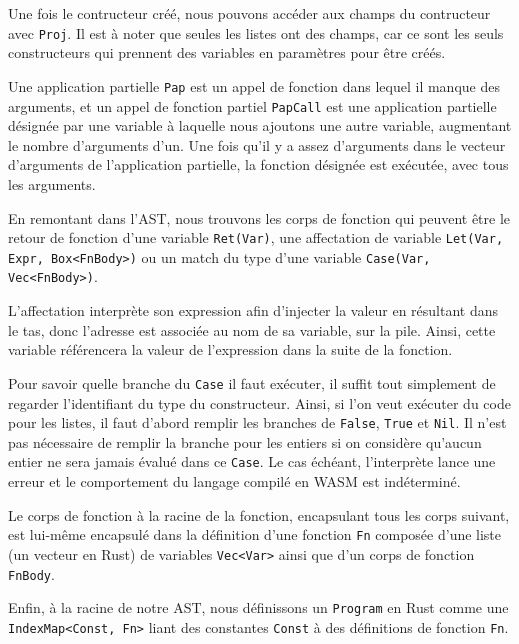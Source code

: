 \documentclass{rapportECL}
\begin{document}
Une fois le contructeur créé, nous pouvons accéder aux champs du contructeur avec \verb|Proj|.
Il est à noter que seules les listes ont des champs, car ce sont les seuls constructeurs qui prennent
des variables en paramètres pour être créés.

\medskip

Une application partielle \verb|Pap| est un appel de fonction dans lequel il manque des arguments, 
et un appel de fonction partiel \verb|PapCall| est une application partielle désignée par une variable
à laquelle nous ajoutons une autre variable, augmentant le nombre d'arguments d'un. 
Une fois qu'il y a assez d'arguments dans le vecteur d'arguments de l'application partielle,
la fonction désignée est exécutée, avec tous les arguments.

\bigskip

En remontant dans l'AST, nous trouvons les corps de fonction qui peuvent être le retour de fonction d'une variable \verb|Ret(Var)|, 
une affectation de variable \verb|Let(Var, Expr, Box<FnBody>)| ou un match du type d'une variable 
\verb|Case(Var, Vec<FnBody>)|.

L'affectation interprète son expression afin d'injecter la valeur en résultant dans le tas, donc l'adresse est associée
au nom de sa variable, sur la pile. Ainsi, cette variable référencera la valeur de l'expression
dans la suite de la fonction.

\medskip

Pour savoir quelle branche du \verb|Case| il faut exécuter, il suffit tout simplement de regarder
l'identifiant du type du constructeur. Ainsi, si l'on veut exécuter du code pour les listes,
il faut d'abord remplir les branches de \verb|False|, \verb|True| et \verb|Nil|.
Il n'est pas nécessaire de remplir la branche pour les entiers si on considère qu'aucun entier
ne sera jamais évalué dans ce \verb|Case|. Le cas échéant, l'interprète lance une erreur et le comportement
du langage compilé en WASM est indéterminé.

\medskip

Le corps de fonction à la racine de la fonction, encapsulant tous les corps suivant, 
est lui-même encapsulé dans la définition d'une fonction \verb|Fn| composée d'une liste (un vecteur en Rust) de variables \verb|Vec<Var>| ainsi que
d'un corps de fonction \verb|FnBody|.

\medskip

Enfin, à la racine de notre AST, nous définissons un \verb|Program| en Rust comme une \verb|IndexMap<Const, Fn>| liant des constantes \verb|Const| à 
des définitions de fonction \verb|Fn|.
\end{document}
